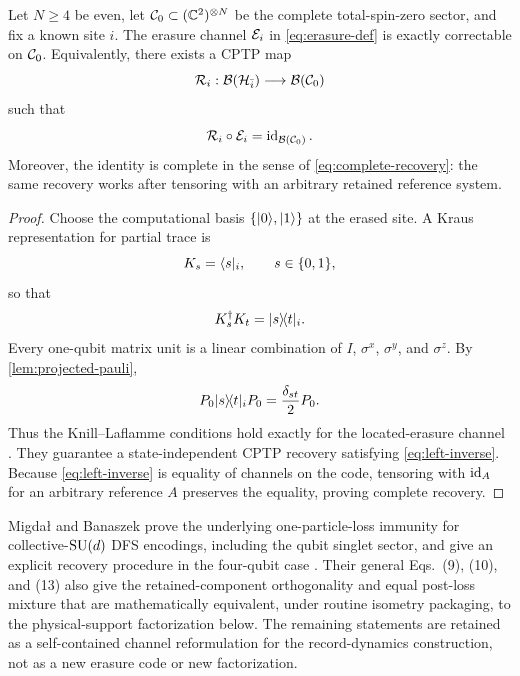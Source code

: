 \begin{theorem}
\label{thm:known-erasure}
Let $N\ge4$ be even, let $\mathcal C_0\subset(\mathbb C^2)^{\otimes N}$ be the complete total-spin-zero sector, and fix a known site $i$.  The erasure channel $\mathcal E_i$ in \cref{eq:erasure-def} is exactly correctable on $\mathcal C_0$.  Equivalently, there exists a CPTP map
\begin{equation}
  \mathcal R_i:\mathcal B(\mathcal H_{\bar i})\longrightarrow\mathcal B(\mathcal C_0)
\end{equation}
such that
\begin{equation}
  \mathcal R_i\circ\mathcal E_i
  =\operatorname{id}_{\mathcal B(\mathcal C_0)}.
  \label{eq:left-inverse}
\end{equation}
Moreover, the identity is complete in the sense of \cref{eq:complete-recovery}: the same recovery works after tensoring with an arbitrary retained reference system.
\end{theorem}

\begin{proof}
Choose the computational basis $\{\lvert 0\rangle,\lvert 1\rangle\}$ at the erased site.  A Kraus representation for partial trace is
\begin{equation}
  K_s=\langle s\rvert_i,
  \qquad s\in\{0,1\},
\end{equation}
so that
\begin{equation}
  K_s^\dagger K_t=\lvert s\rangle\!\langle t\rvert_i.
\end{equation}
Every one-qubit matrix unit is a linear combination of $I$, $\sigma^x$, $\sigma^y$, and $\sigma^z$.  By \cref{lem:projected-pauli},
\begin{equation}
  P_0\lvert s\rangle\!\langle t\rvert_iP_0
  =\frac{\delta_{st}}{2}P_0.
  \label{eq:matrix-unit-kl}
\end{equation}
Thus the Knill--Laflamme conditions hold exactly for the located-erasure channel \cite{KnillLaflamme1997,GrasslBethPellizzari1997}.  They guarantee a state-independent CPTP recovery satisfying \cref{eq:left-inverse}.  Because \cref{eq:left-inverse} is equality of channels on the code, tensoring with $\operatorname{id}_A$ for an arbitrary reference $A$ preserves the equality, proving complete recovery.
\end{proof}

Migda\l{} and Banaszek prove the underlying one-particle-loss immunity for collective-$\mathrm{SU}(d)$ DFS encodings, including the qubit singlet sector, and give an explicit recovery procedure in the four-qubit case \cite{MigdalBanaszek2011}.  Their general Eqs.~(9), (10), and (13) also give the retained-component orthogonality and equal post-loss mixture that are mathematically equivalent, under routine isometry packaging, to the physical-support factorization below.  The remaining statements are retained as a self-contained channel reformulation for the record-dynamics construction, not as a new erasure code or new factorization.

